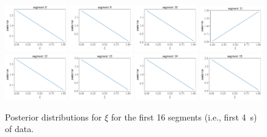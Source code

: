 \begin{figure}[htbp!]
\begin{center}
\includegraphics[width=0.24\textwidth]{Figures/posterior_xi_seg_8}
\includegraphics[width=0.24\textwidth]{Figures/posterior_xi_seg_9}
\includegraphics[width=0.24\textwidth]{Figures/posterior_xi_seg_10}
\includegraphics[width=0.24\textwidth]{Figures/posterior_xi_seg_11}
\includegraphics[width=0.24\textwidth]{Figures/posterior_xi_seg_12}
\includegraphics[width=0.24\textwidth]{Figures/posterior_xi_seg_13}
\includegraphics[width=0.24\textwidth]{Figures/posterior_xi_seg_14}
\includegraphics[width=0.24\textwidth]{Figures/posterior_xi_seg_15}
\caption{Posterior distributions for $\xi$ for the first 16 segments
(i.e., first 4~s) of data.}
\label{f:posteriors_xi_seg}
\end{center}
\end{figure}

